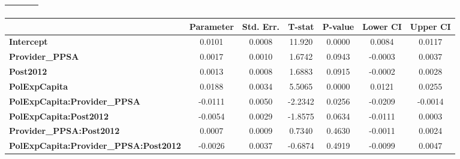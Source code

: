 \begin{center}
\begin{tabular}{lclc}
\textbf{}                                     &                    & \textbf{                     }   &                  \\
\bottomrule
\end{tabular}
\begin{tabular}{lcccccc}
                                              & \textbf{Parameter} & \textbf{Std. Err.} & \textbf{T-stat} & \textbf{P-value} & \textbf{Lower CI} & \textbf{Upper CI}  \\
\midrule
\textbf{Intercept}                            &       0.0101       &       0.0008       &      11.920     &      0.0000      &       0.0084      &       0.0117       \\
\textbf{Provider\_PPSA}                       &       0.0017       &       0.0010       &      1.6742     &      0.0943      &      -0.0003      &       0.0037       \\
\textbf{Post2012}                             &       0.0013       &       0.0008       &      1.6883     &      0.0915      &      -0.0002      &       0.0028       \\
\textbf{PolExpCapita}                         &       0.0188       &       0.0034       &      5.5065     &      0.0000      &       0.0121      &       0.0255       \\
\textbf{PolExpCapita:Provider\_PPSA}          &      -0.0111       &       0.0050       &     -2.2342     &      0.0256      &      -0.0209      &      -0.0014       \\
\textbf{PolExpCapita:Post2012}                &      -0.0054       &       0.0029       &     -1.8575     &      0.0634      &      -0.0111      &       0.0003       \\
\textbf{Provider\_PPSA:Post2012}              &       0.0007       &       0.0009       &      0.7340     &      0.4630      &      -0.0011      &       0.0024       \\
\textbf{PolExpCapita:Provider\_PPSA:Post2012} &      -0.0026       &       0.0037       &     -0.6874     &      0.4919      &      -0.0099      &       0.0047       \\
\bottomrule
\end{tabular}
\end{center}